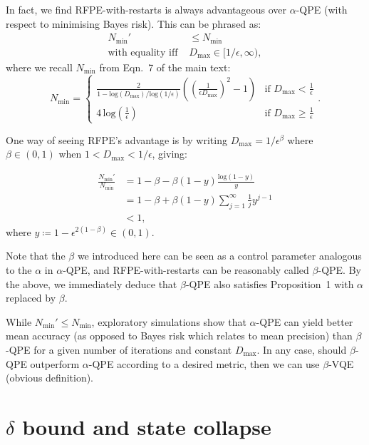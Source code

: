 \documentclass[twocolumn,
 reprint,
 amsmath,amssymb,
 aps,
 floatfix,
superscriptaddress
]{revtex4-1}
\begin{document}
In fact, we find RFPE-with-restarts is always advantageous over $\alpha$-QPE (with respect to minimising Bayes risk). This can be phrased as:
\begin{align}
    N_{\text{min}}'&\leq N_{\text{min}}\\
    \text{with equality iff }& D_{\text{max}}\in[1/\epsilon,\infty),
\end{align} 
where we recall $N_{\text{min}}$ from Eqn.~7 of the main text:
\begin{equation}
N_{\text{min}} = \begin{cases}
\frac{2}{1-\text{log}(D_{\text{max}})/\text{log}(1/\epsilon)}((\frac{1}{\epsilon D_{\text{max}}})^{2}-1) & \text{if }D_{\text{max}}<\frac{1}{\epsilon}\\[5pt]
4\,\text{log}(\frac{1}{\epsilon}) & \text{if }D_{\text{max}}\geq\frac{1}{\epsilon}
\end{cases}.
\end{equation}

One way of seeing RFPE's advantage is by writing $D_{\text{max}}=1/\epsilon^{\beta}$ where $\beta\in(0,1)$
when $1< D_{\text{max}}<1/\epsilon$, giving:

\begin{align}\label{al:3}
\frac{N_{\text{min}}'}{N_{\text{min}}} & =1-\beta-\beta(1-y)\frac{\text{log}(1-y)}{y}\nonumber \\
 & =1-\beta+\beta(1-y)\sum_{j=1}^{\infty}\frac{1}{j}y^{j-1}\nonumber \\
 & <1,
\end{align}
where $y\coloneqq1-\epsilon^{2(1-\beta)}\in(0,1)$. 

Note that the $\beta$ we introduced here can be
seen as a control parameter analogous to the $\alpha$ in $\alpha$-QPE,
and RFPE-with-restarts can be reasonably called $\beta$-QPE. By the above, we immediately deduce that $\beta$-QPE also satisfies Proposition~1 with $\alpha$ replaced by $\beta$.

While $N_{\text{min}}'\leq N_{\text{min}}$, exploratory simulations
show that $\alpha\text{-}$QPE can yield better mean
accuracy (as opposed to Bayes risk which relates to mean precision) than $\beta$-QPE for a given number of iterations
and constant $D_{\text{max}}$. In any case, should $\beta$-QPE outperform $\alpha$-QPE according to a desired metric, then we can use $\beta$-VQE (obvious definition). 

\section{$\delta$ bound and state collapse}\label{subsec:State Collapse} 
\end{document}
